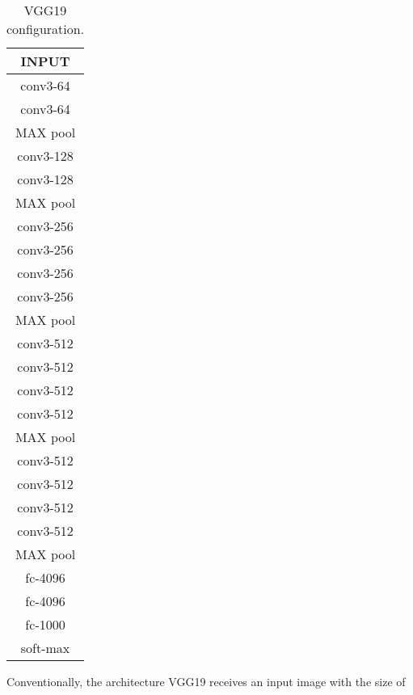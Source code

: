 \begin{wraptable}[29]{r}{0mm}
    \begin{tabular}{ | c | }
        \hline
        \rowcolor{lightgray} INPUT \\
        \hline
        \acrshort{conv}3-64 \\
        \acrshort{conv}3-64 \\
        \hline
        \rowcolor{lightgray} MAX \acrshort{pool} \\
        \hline
        \acrshort{conv}3-128 \\
        \acrshort{conv}3-128 \\
        \hline
        \rowcolor{lightgray} MAX \acrshort{pool} \\
        \hline
        \acrshort{conv}3-256 \\
        \acrshort{conv}3-256 \\
        \acrshort{conv}3-256 \\
        \acrshort{conv}3-256 \\
        \hline
        \rowcolor{lightgray} MAX \acrshort{pool} \\
        \hline
        \acrshort{conv}3-512 \\
        \acrshort{conv}3-512 \\
        \acrshort{conv}3-512 \\
        \acrshort{conv}3-512 \\
        \hline
        \rowcolor{lightgray} MAX \acrshort{pool} \\
        \hline
        \acrshort{conv}3-512 \\
        \acrshort{conv}3-512 \\
        \acrshort{conv}3-512 \\
        \acrshort{conv}3-512 \\
        \hline
        \rowcolor{lightgray} MAX \acrshort{pool} \\
        \hline
        \acrshort{fc}-4096 \\
        \hline
        \acrshort{fc}-4096 \\
        \hline
        \acrshort{fc}-1000 \\
        \hline
        \rowcolor{lightgray} soft-max \\
        \hline
    \end{tabular}
    \caption{VGG19 configuration.}
    \label{tab:vgg19}
\end{wraptable}
Conventionally, the architecture VGG19 receives an input image with the size of
